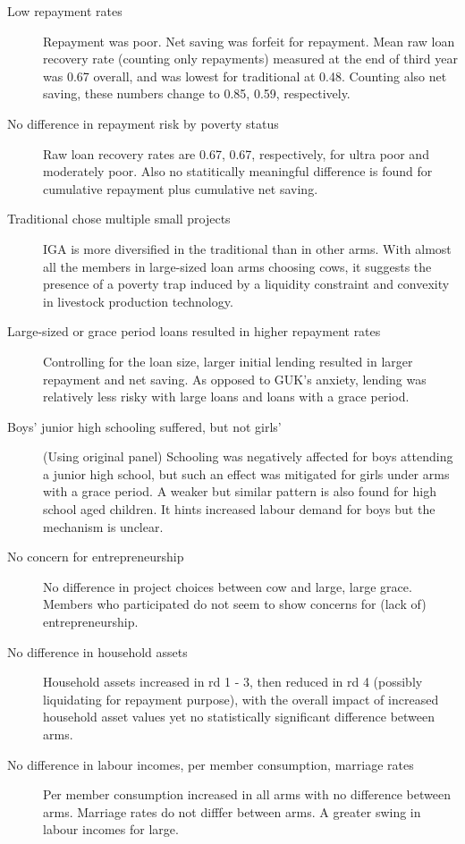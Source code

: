 \begin{description}
\vspace{1.0ex}\setlength{\itemsep}{1.0ex}\setlength{\baselineskip}{12pt}
\item[Low repayment rates]	Repayment was poor. Net saving was forfeit for repayment. Mean raw loan recovery rate (counting only repayments) measured at the end of third year was 0.67 overall, and was lowest for \textsf{traditional} at 0.48. Counting also net saving, these numbers change to 0.85, 0.59, respectively.
\item[No difference in repayment risk by poverty status] Raw loan recovery rates are 0.67, 0.67, respectively, for ultra poor and moderately poor. Also no statitically meaningful difference is found for cumulative repayment plus cumulative net saving.
\item[Traditional chose multiple small projects]	IGA is more diversified in the \textsf{traditional} than in other arms. With almost all the members in large-sized loan arms choosing cows, it suggests the presence of a poverty trap induced by a liquidity constraint and convexity in livestock production technology.
\item[Large-sized or grace period loans resulted in higher repayment rates]	Controlling for the loan size, larger initial lending resulted in larger repayment and net saving. As opposed to GUK's anxiety, lending was relatively less risky with large loans and loans with a grace period.
\item[Boys' junior high schooling suffered, but not girls']	(Using original panel) Schooling was negatively affected for boys attending a junior high school, but such an effect was mitigated for girls under arms with a grace period.  A weaker but similar pattern is also found for high school aged children. It hints increased labour demand for boys but the mechanism is unclear.
\item[No concern for entrepreneurship]	No difference in project choices between \textsf{cow} and \textsf{large, large grace}. Members who participated do not seem to show concerns for (lack of) entrepreneurship.
\item[No difference in household assets]	Household assets increased in rd 1 - 3, then reduced in rd 4 (possibly liquidating for repayment purpose), with the overall impact of increased household asset values yet no statistically significant difference between arms. 
\item[No difference in labour incomes, per member consumption, marriage rates]	Per member consumption increased in all arms with no difference between arms. Marriage rates do not difffer between arms. A greater swing in labour incomes for \textsf{large}.
\end{description}

